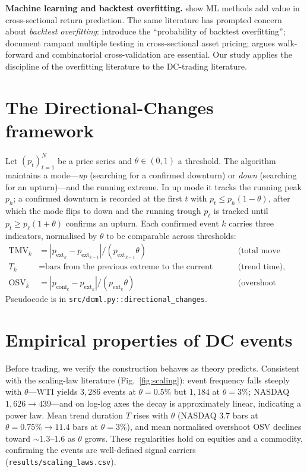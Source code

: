 \documentclass[11pt]{article}
\begin{document}
\textbf{Machine learning and backtest overfitting.} \citet{gu2020} show ML
methods add value in cross-sectional return prediction. The same literature has
prompted concern about \emph{backtest overfitting}: \citet{bailey2014} introduce
the ``probability of backtest overfitting''; \citet{harvey2016} document rampant
multiple testing in cross-sectional asset pricing; \citet{lopezdeprado2018}
argues walk-forward and combinatorial cross-validation are essential. Our study
applies the discipline of the overfitting literature to the DC-trading
literature.

\section{The Directional-Changes framework}
Let $(p_t)_{t=1}^N$ be a price series and $\theta \in (0,1)$ a threshold. The
algorithm maintains a mode---\emph{up} (searching for a confirmed downturn) or
\emph{down} (searching for an upturn)---and the running extreme. In up mode it
tracks the running peak $p_h$; a confirmed downturn is recorded at the first $t$
with $p_t \le p_h(1-\theta)$, after which the mode flips to down and the running
trough $p_\ell$ is tracked until $p_t \ge p_\ell(1+\theta)$ confirms an upturn.
Each confirmed event $k$ carries three indicators, normalised by $\theta$ to be
comparable across thresholds:
\begin{align*}
\text{TMV}_k &= |p_{\mathrm{ext}_k}-p_{\mathrm{ext}_{k-1}}|/(p_{\mathrm{ext}_{k-1}}\theta)
  & &\text{(total move value),}\\
T_k &= \text{bars from the previous extreme to the current extreme}
  & &\text{(trend time),}\\
\text{OSV}_k &= |p_{\mathrm{conf}_k}-p_{\mathrm{ext}_k}|/(p_{\mathrm{ext}_k}\theta)
  & &\text{(overshoot value).}
\end{align*}
Pseudocode is in \texttt{src/dcml.py::directional\_changes}.

\section{Empirical properties of DC events}
Before trading, we verify the construction behaves as theory predicts.
Consistent with the scaling-law literature (Fig.~\ref{fig:scaling}): event
frequency falls steeply with $\theta$---WTI yields $3{,}286$ events at
$\theta=0.5\%$ but $1{,}184$ at $\theta=3\%$; NASDAQ $1{,}626\to439$---and on
log-log axes the decay is approximately linear, indicating a power law. Mean
trend duration $T$ rises with $\theta$ (NASDAQ $3.7$ bars at $\theta=0.75\%
\to 11.4$ bars at $\theta=3\%$), and mean normalised overshoot OSV declines
toward ${\sim}1.3$--$1.6$ as $\theta$ grows. These regularities hold on equities
and a commodity, confirming the events are well-defined signal carriers
(\texttt{results/scaling\_laws.csv}).
\end{document}
